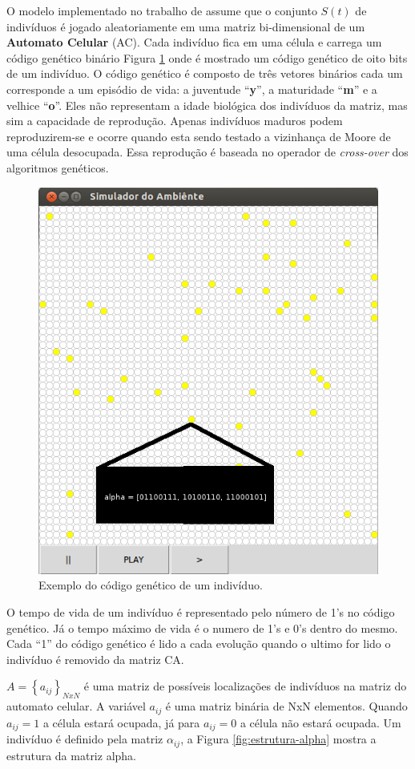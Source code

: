 \documentclass[12pt]{article}
\begin{document}
O modelo implementado no trabalho de \cite{dzwinel:04} assume que o conjunto
$S(t)$ de indivíduos é jogado aleatoriamente em uma matriz bi-dimensional
de um \textbf{Automato Celular} (AC). Cada indivíduo fica em uma célula e
carrega um código genético binário Figura \ref{fig:codigo-genetico} onde é
mostrado um código genético de oito bits de um indivíduo. O código genético é
composto de três vetores binários cada um corresponde a um episódio de vida: a
juventude ``\textbf{y}'', a maturidade ``\textbf{m}'' e a velhice 
``\textbf{o}''. Eles não representam a idade biológica dos indivíduos da
matriz, mas sim a capacidade de reprodução. Apenas indivíduos maduros podem
reproduzirem-se e ocorre quando esta sendo testado a vizinhança de Moore de
uma célula desocupada. Essa reprodução é baseada no operador de
\textit{cross-over} dos algoritmos genéticos.

\begin{figure}[!ht]
\centering
\includegraphics[width=.5\textwidth]{imagens/codigo-genetico}
\caption{Exemplo do código genético de um indivíduo.}
\label{fig:codigo-genetico}
\end{figure}

O tempo de vida de um indivíduo é representado pelo número de 1's no código
genético. Já o tempo máximo de vida é o numero de 1's e 0's dentro do mesmo.
Cada ``1'' do código genético é lido a cada evolução quando o ultimo for lido
o indivíduo é removido da matriz CA.

$A = \left \{a_{ij}\right \}_{NxN}$ é uma matriz de possíveis localizações de
indivíduos na matriz do automato celular. A variável $a_{ij}$ é uma matriz
binária de NxN elementos. Quando $a_{ij} = 1$ a célula estará ocupada, já para
$a_{ij} = 0$ a célula não estará ocupada. Um indivíduo é definido pela matriz
$\alpha _{ij}$, a Figura \ref{fig:estrutura-alpha} mostra a estrutura da
matriz alpha.
\end{document}
